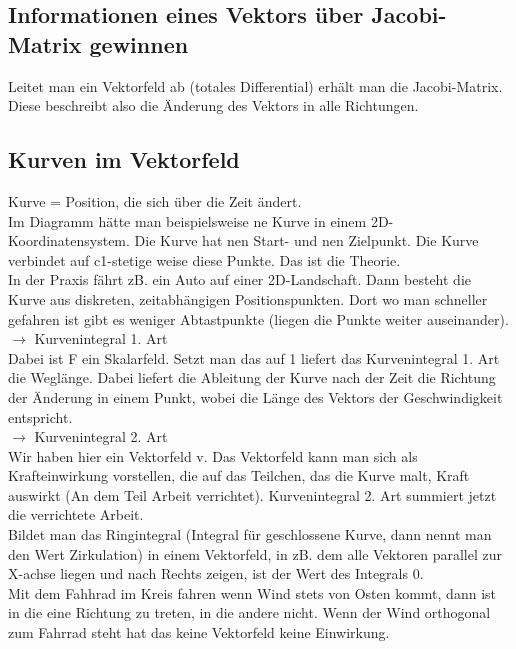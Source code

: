 \documentclass{article}
\begin{document}
\subsection{Informationen eines Vektors über Jacobi-Matrix gewinnen}
Leitet man ein Vektorfeld ab (totales Differential) erhält man die Jacobi-Matrix. Diese beschreibt also die Änderung des Vektors in alle Richtungen.\\

\subsection{Kurven im Vektorfeld}
Kurve = Position, die sich über die Zeit ändert.\\
Im Diagramm hätte man beispielsweise ne Kurve in einem 2D-Koordinatensystem. Die Kurve hat nen Start- und nen Zielpunkt. Die Kurve verbindet auf c1-stetige weise diese Punkte. Das ist die Theorie.\\

\noindent In der Praxis fährt zB. ein Auto auf einer 2D-Landschaft. Dann besteht die Kurve aus diskreten, zeitabhängigen Positionspunkten. Dort wo man schneller gefahren ist gibt es weniger Abtastpunkte (liegen die Punkte weiter auseinander). \\

\noindent  $\rightarrow$ Kurvenintegral 1. Art\\ 
Dabei ist F ein Skalarfeld. Setzt man das auf 1 liefert das Kurvenintegral 1. Art die Weglänge. 
Dabei liefert die Ableitung der Kurve nach der Zeit die Richtung der Änderung in einem Punkt, wobei die Länge des Vektors der Geschwindigkeit entspricht.\\

\noindent  $\rightarrow$ Kurvenintegral 2. Art\\ 
Wir haben hier ein Vektorfeld v. Das Vektorfeld kann man sich als Krafteinwirkung vorstellen, die auf das Teilchen, das die Kurve malt, Kraft auswirkt (An dem Teil Arbeit verrichtet). Kurvenintegral 2. Art summiert jetzt die verrichtete Arbeit.\\

\noindent Bildet man das Ringintegral (Integral für geschlossene Kurve, dann nennt man den Wert Zirkulation) in einem Vektorfeld, in zB. dem alle Vektoren parallel zur X-achse liegen und nach Rechts zeigen, ist der Wert des Integrals 0.\\
Mit dem Fahhrad im Kreis fahren wenn Wind stets von Osten kommt, dann ist in die eine Richtung zu treten, in die andere nicht. Wenn der Wind orthogonal zum Fahrrad steht hat das keine Vektorfeld keine Einwirkung.\\
\end{document}
